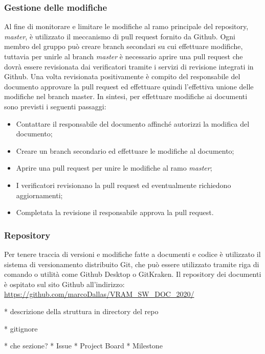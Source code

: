 	\subsubsection{Gestione delle modifiche}
		Al fine di monitorare e limitare le modifiche al ramo principale del repository, \textit{master}, è utilizzato il meccanismo di pull request fornito da Github. Ogni membro del gruppo può creare branch secondari su cui effettuare modifiche, tuttavia per unirle al branch \textit{master} è necessario aprire una pull request che dovrà essere revisionata dai verificatori tramite i servizi di revisione integrati in Github. Una volta revisionata positivamente è compito del responsabile del documento approvare la pull request ed effettuare quindi l'effettiva unione delle modifiche nel branch master.
		\newline
		In sintesi, per effettuare modifiche ai documenti sono previsti i seguenti passaggi:
		\begin{itemize}
			\item Contattare il responsabile del documento affinché autorizzi la modifica del documento;
			\item Creare un branch secondario ed effettuare le modifiche al documento;
			\item Aprire una pull request per unire le modifiche al ramo \textit{master};
			\item I verificatori revisionano la pull request ed eventualmente richiedono aggiornamenti;
			\item Completata la revisione il responsabile approva la pull request.
		\end{itemize}
		
	\subsubsection{Repository}
		Per tenere traccia di versioni e modifiche fatte a documenti e codice è utilizzato il sistema di versionamento distribuito Git, che può essere utilizzato tramite riga di comando o utilità come Github Desktop o GitKraken.
		Il repository dei documenti è ospitato sul sito Github all'indirizzo: \url{https://github.com/marcoDallas/VRAM_SW_DOC_2020/}

		* descrizione della struttura in directory del repo
		
		* gitignore
		
		* che sezione?
		* Issue
		* Project Board
		* Milestone
		